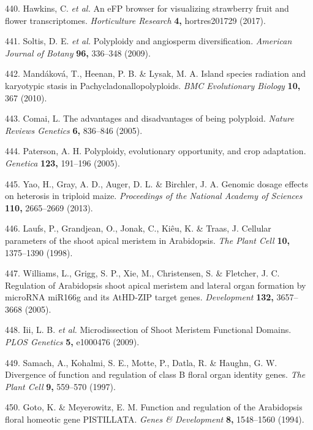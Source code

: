 \documentclass[12pt,]{book}
\begin{document}
\hypertarget{ref-hawkins_efp_2017}{}
440. Hawkins, C. \emph{et al.} An eFP browser for visualizing strawberry
fruit and flower transcriptomes. \emph{Horticulture Research}
\textbf{4,} hortres201729 (2017).

\hypertarget{ref-soltis_polyploidy_2009}{}
441. Soltis, D. E. \emph{et al.} Polyploidy and angiosperm
diversification. \emph{American Journal of Botany} \textbf{96,} 336--348
(2009).

\hypertarget{ref-mandakova_island_2010}{}
442. Mandáková, T., Heenan, P. B. \& Lysak, M. A. Island species
radiation and karyotypic stasis in Pachycladonallopolyploids. \emph{BMC
Evolutionary Biology} \textbf{10,} 367 (2010).

\hypertarget{ref-comai_advantages_2005}{}
443. Comai, L. The advantages and disadvantages of being polyploid.
\emph{Nature Reviews Genetics} \textbf{6,} 836--846 (2005).

\hypertarget{ref-paterson_polyploidy_2005}{}
444. Paterson, A. H. Polyploidy, evolutionary opportunity, and crop
adaptation. \emph{Genetica} \textbf{123,} 191--196 (2005).

\hypertarget{ref-yao_genomic_2013}{}
445. Yao, H., Gray, A. D., Auger, D. L. \& Birchler, J. A. Genomic
dosage effects on heterosis in triploid maize. \emph{Proceedings of the
National Academy of Sciences} \textbf{110,} 2665--2669 (2013).

\hypertarget{ref-laufs_cellular_1998}{}
446. Laufs, P., Grandjean, O., Jonak, C., Kiêu, K. \& Traas, J. Cellular
parameters of the shoot apical meristem in Arabidopsis. \emph{The Plant
Cell} \textbf{10,} 1375--1390 (1998).

\hypertarget{ref-williams_regulation_2005}{}
447. Williams, L., Grigg, S. P., Xie, M., Christensen, S. \& Fletcher,
J. C. Regulation of Arabidopsis shoot apical meristem and lateral organ
formation by microRNA miR166g and its AtHD-ZIP target genes.
\emph{Development} \textbf{132,} 3657--3668 (2005).

\hypertarget{ref-brooks_microdissection_2009}{}
448. Iii, L. B. \emph{et al.} Microdissection of Shoot Meristem
Functional Domains. \emph{PLOS Genetics} \textbf{5,} e1000476 (2009).

\hypertarget{ref-samach_divergence_1997}{}
449. Samach, A., Kohalmi, S. E., Motte, P., Datla, R. \& Haughn, G. W.
Divergence of function and regulation of class B floral organ identity
genes. \emph{The Plant Cell} \textbf{9,} 559--570 (1997).

\hypertarget{ref-goto_function_1994}{}
450. Goto, K. \& Meyerowitz, E. M. Function and regulation of the
Arabidopsis floral homeotic gene PISTILLATA. \emph{Genes \& Development}
\textbf{8,} 1548--1560 (1994).
\end{document}
